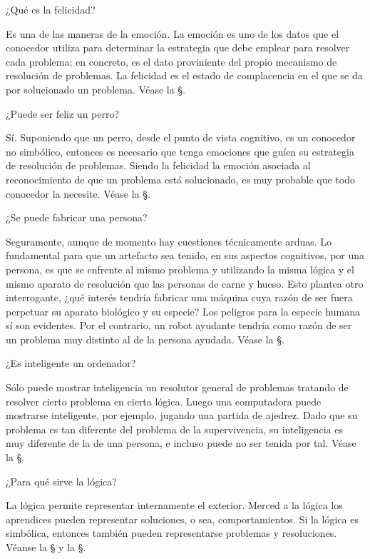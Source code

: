 \Q ¿Qué es la felicidad?

Es una de las maneras de la emoción.  La emoción es uno de los datos que el
conocedor utiliza para determinar la estrategia que debe emplear para
resolver cada problema; en concreto, es el dato proviniente del propio
mecanismo de resolución de problemas.  La felicidad es el estado de
complacencia en el que se da por solucionado un problema.  Véase la
\S{}.

\Q ¿Puede ser feliz un perro?

Sí.  Suponiendo que un perro, desde el punto de vista cognitivo, es un
conocedor no simbólico, entonces es necesario que tenga emociones que guíen
su estrategia de resolución de problemas.  Siendo la felicidad la emoción
asociada al reconocimiento de que un problema está solucionado, es muy
probable que todo conocedor la necesite.  Véase la \S{}.

\Q ¿Se puede fabricar una persona?

Seguramente, aunque de momento hay cuestiones técnicamente arduas.  Lo
fundamental para que un artefacto sea tenido, en sus aspectos cognitivos,
por una persona, es que se enfrente al mismo problema y utilizando la misma
lógica y el mismo aparato de resolución que las personas de carne y hueso.
Esto plantea otro interrogante, ¿qué interés tendría fabricar una máquina
cuya razón de ser fuera perpetuar su aparato biológico y su especie?  Los
peligros para la especie humana sí son evidentes.  Por el contrario, un
robot ayudante tendría como razón de ser un problema muy distinto al de la
persona ayudada.  Véase la \S{}.

\Q ¿Es inteligente un ordenador?

Sólo puede mostrar inteligencia un resolutor general de problemas tratando
de resolver cierto problema en cierta lógica.  Luego una computadora puede
mostrarse inteligente, por ejemplo, jugando una partida de ajedrez. Dado que
su problema es tan diferente del problema de la supervivencia, su
inteligencia es muy diferente de la de una persona, e incluso puede no ser
tenida por tal.  Véase la \S{}.

\Q ¿Para qué sirve la lógica?

La lógica permite representar internamente el exterior.  Merced a la lógica
los aprendices pueden representar soluciones, o sea, comportamientos.  Si la
lógica es simbólica, entonces también pueden representarse problemas y
resoluciones.  Véanse la \S{} y la \S{}.

